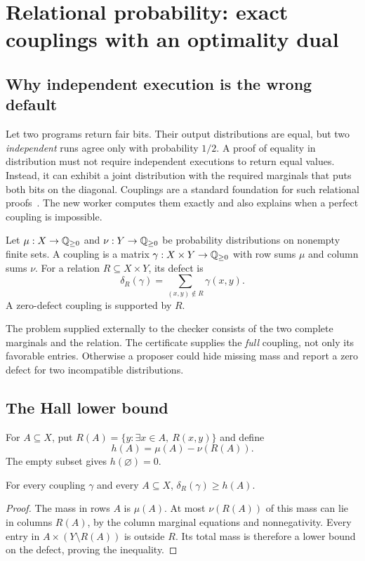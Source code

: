 \section{Relational probability: exact couplings with an optimality dual}
\label{sec:transport}

\subsection{Why independent execution is the wrong default}

Let two programs return fair bits. Their output distributions are equal, but
two \emph{independent} runs agree only with probability $1/2$. A proof of equality
in distribution must not require independent executions to return equal values.
Instead, it can exhibit a joint distribution with the required marginals that
puts both bits on the diagonal. Couplings are a standard foundation for such
relational proofs~\cite{coupling}. The new worker computes them exactly and
also explains when a perfect coupling is impossible.

\begin{definition}
Let $\mu:X\to\mathbb{Q}_{\ge0}$ and $\nu:Y\to\mathbb{Q}_{\ge0}$ be probability distributions on
nonempty finite sets. A coupling is a matrix $\gamma:X\times Y\to\mathbb{Q}_{\ge0}$
with row sums $\mu$ and column sums $\nu$. For a relation $R\subseteq X\times Y$,
its defect is
\[
 \delta_R(\gamma)=\sum_{(x,y)\notin R}\gamma(x,y).
\]
A zero-defect coupling is supported by $R$.
\end{definition}

The problem supplied externally to the checker consists of the two complete
marginals and the relation. The certificate supplies the \emph{full} coupling,
not only its favorable entries. Otherwise a proposer could hide missing mass
and report a zero defect for two incompatible distributions.

\subsection{The Hall lower bound}

For $A\subseteq X$, put $R(A)=\{y:\exists x\in A,\ R(x,y)\}$ and define
\[
 h(A)=\mu(A)-\nu(R(A)).
\]
The empty subset gives $h(\varnothing)=0$.

\begin{lemma}
\label{lem:hall}
For every coupling $\gamma$ and every $A\subseteq X$,
$\delta_R(\gamma)\ge h(A)$.
\end{lemma}
\begin{proof}
The mass in rows $A$ is $\mu(A)$. At most $\nu(R(A))$ of this mass can lie in
columns $R(A)$, by the column marginal equations and nonnegativity. Every entry
in $A\times(Y\setminus R(A))$ is outside $R$. Its total mass is therefore a
lower bound on the defect, proving the inequality.
\end{proof}


